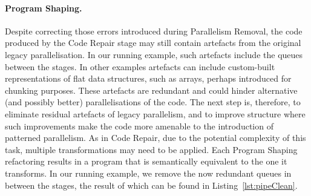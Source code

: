 
\paragraph{Program Shaping.}
Despite correcting those errors introduced during Parallelism Removal, the code produced by the Code Repair stage may still contain artefacts from the original legacy parallelisation. In our running example, such artefacts include the queues between the stages.
%
In other examples artefacts can include custom-built representations of flat data structures, such as arrays, perhaps introduced for chunking purposes.
%
These artefacts are redundant and could hinder alternative (and possibly better) parallelisations of the code. The next step is, therefore, to eliminate residual artefacts of legacy parallelism, and to improve structure where such improvements make the code more amenable to the introduction of patterned parallelism.
%
As in Code Repair, due to the potential complexity of this task, multiple transformations may need to be applied.
%
Each Program Shaping refactoring results in a program that is semantically equivalent to the one it transforms.
%
In our running example, we remove the now redundant queues in between the stages, the result of which can be found in Listing~\ref{lst:pipeClean}.


